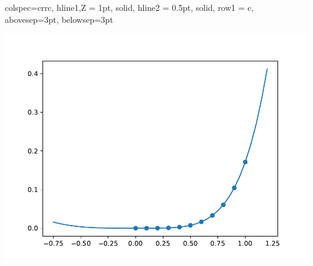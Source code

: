\documentclass[a4paper, 11pt]{report}
\begin{document}
\begin{enumerate}[leftmargin=*]
\begin{enumerate}[leftmargin=*]
\begin{minipage}{0.42\columnwidth}
\begin{tblr}{
                colspec={crrc},
                hline{1,Z} = {1pt, solid},
                hline{2} = {0.5pt, solid},
                row{1} = {c, abovesep=3pt, belowsep=3pt}
                }
            \end{tblr}
        \end{minipage}
        \hfill
        \begin{minipage}{0.53\columnwidth}
            \includegraphics[width=\columnwidth]{../sistemas de edos/q3a.pdf}
        \end{minipage}
    \end{enumerate}
\end{enumerate}

\setcounter{chapter}{1}
\setcounter{section}{0}
\renewcommand\thechapter{\Alph{chapter}}
\end{document}
